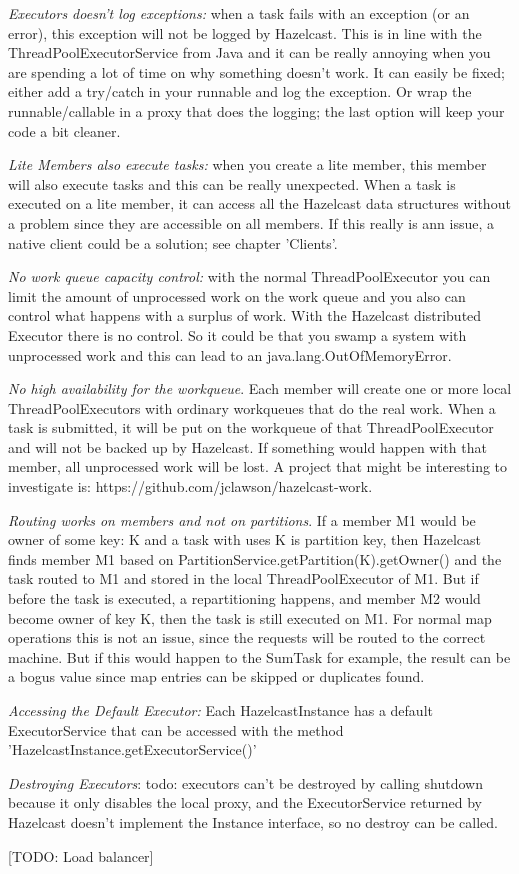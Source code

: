 \emph{Executors doesn't log exceptions:} when a task fails with an exception (or an error), this exception will not be logged by Hazelcast. This is in line with the ThreadPoolExecutorService from Java and it can be really annoying when you are spending a lot of time on why something doesn't work. It can easily be fixed; either add a try/catch in your runnable and log the exception. Or wrap the runnable/callable in a proxy that does the logging; the last option will keep your code a bit cleaner. 

\emph{Lite Members also execute tasks:} when you create a lite member, this member will also execute tasks and this can be really unexpected. When a task is executed on a lite member, it can access all the Hazelcast data structures without a problem since they are accessible on all members. If this really is ann issue, a native client could be a solution; see chapter 'Clients'.

\emph{No work queue capacity control:} with the normal ThreadPoolExecutor you can limit the amount of unprocessed work on the work queue and you also can control what happens with a surplus of work. With the Hazelcast distributed Executor there is no control. So it could be that you swamp a system with unprocessed work and this can lead to an java.lang.OutOfMemoryError.

\emph{No high availability for the workqueue}. Each member will create one or more local ThreadPoolExecutors with ordinary workqueues that do the real work. When a task is submitted, it will be put on the workqueue of that ThreadPoolExecutor and will not be backed up by Hazelcast. If something would happen with that member, all unprocessed work will be lost. A project that might be interesting to investigate is: https://github.com/jclawson/hazelcast-work.

\emph{Routing works on members and not on partitions}. If a member M1 would be owner of some key: K and a task with uses K is partition key, then Hazelcast finds member M1 based on PartitionService.getPartition(K).getOwner() and the task routed to M1 and  stored in the local ThreadPoolExecutor of M1. But if before the task is executed, a repartitioning happens, and member M2 would become owner of key K, then the task is still executed on M1. For normal map operations this is not an issue, since the requests will be routed to the correct machine. But if this would happen to the SumTask for example, the result can be a bogus value since map entries can be skipped or duplicates found. 

\emph{Accessing the Default Executor:} Each HazelcastInstance has a default ExecutorService that can be accessed with the method 'HazelcastInstance.getExecutorService()'

\emph{Destroying Executors}: todo: executors can't be destroyed by calling shutdown because it only disables the local proxy, and the ExecutorService returned by Hazelcast doesn't implement the Instance interface, so no destroy can be called.  

[TODO: Load balancer]
